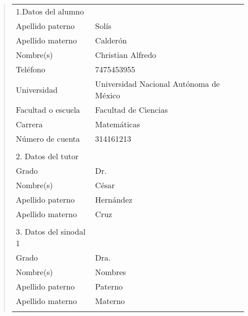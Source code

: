 {\small
\begin{quote}
\begin{tabular}{lll}
1.Datos del alumno          & {}                                          \\
Apellido paterno            & Solís                                     \\
Apellido materno            & Calderón                                     \\
Nombre(s)                   & Christian Alfredo                                     \\
Tel\'efono                  & 7475453955                              \\
Universidad                 & Universidad Nacional Aut\'onoma de M\'exico \\
Facultad o escuela          & Facultad de Ciencias                        \\
Carrera                     & Matemáticas                                     \\
N\'umero de cuenta          & 314161213                                   \\
{}                          & {}                                          \\
2. Datos del tutor          & {}                                          \\
Grado                       & Dr.                                         \\
Nombre(s)                   & C\'esar                                     \\
Apellido paterno            & Hern\'andez                                 \\
Apellido materno            & Cruz                                        \\
{}                          & {}                                          \\
3. Datos del sinodal 1      & {}                                          \\
Grado                       & Dra.                                        \\
Nombre(s)                   & Nombres                                     \\
Apellido paterno            & Paterno                                     \\
Apellido materno            & Materno                                     \\
{}                          & {}                                          \\

\end{tabular}
\end{quote}}
